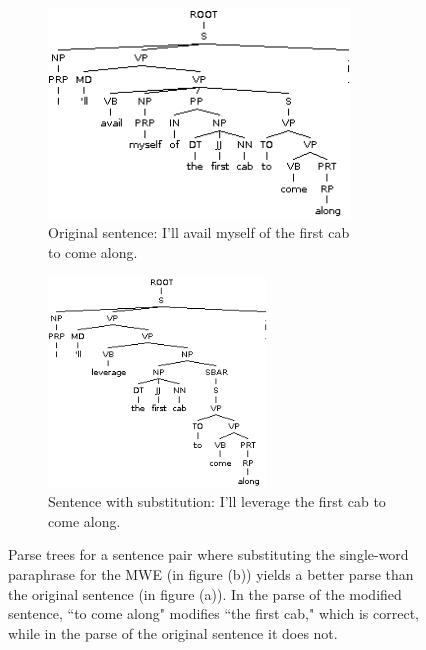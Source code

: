 \documentclass[11pt]{article}
\begin{document}
\begin{figure}
\centering
\begin{subfigure}{.5\textwidth}
  \centering
  \includegraphics[width=80mm]{figs/avail_myself_of_tree.png}
  \caption{Original sentence: I'll avail myself of the first cab \\ to come along.}
  \label{fig:sub1}
\end{subfigure}%
\begin{subfigure}{.5\textwidth}
  \centering
  \includegraphics[width=58mm]{figs/leverage_tree.png}
  \caption{Sentence with substitution: I'll leverage the first cab to come along.}
  \label{fig:sub2}
\end{subfigure}
\caption{Parse trees for a sentence pair where substituting the single-word paraphrase for the MWE (in figure (b)) yields a better parse than the original sentence (in figure (a)). In the parse of the modified sentence, ``to come along" modifies ``the first cab," which is correct, while in the parse of the original sentence it does not.}
\label{avail}
\end{figure}
\end{document}
